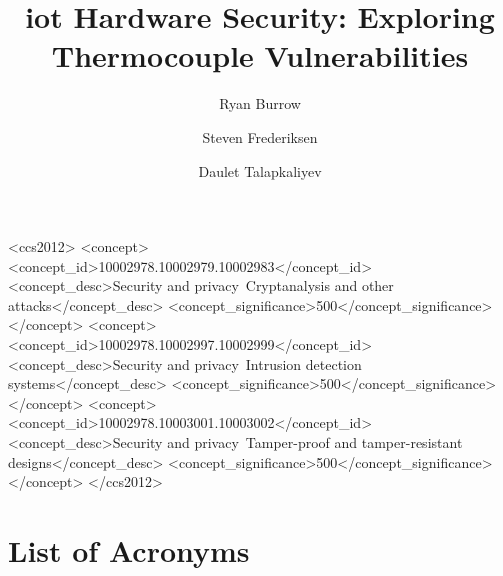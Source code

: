 \documentclass[sigconf,numbers,sort&compress,colorlinks]{acmart}
\begin{document}
\title{\ac{iot} Hardware Security: Exploring Thermocouple Vulnerabilities}

\author{Ryan Burrow}

\author{Steven Frederiksen}

\author{Daulet Talapkaliyev}




%
%
\begin{CCSXML}
<ccs2012>
<concept>
<concept_id>10002978.10002979.10002983</concept_id>
<concept_desc>Security and privacy~Cryptanalysis and other attacks</concept_desc>
<concept_significance>500</concept_significance>
</concept>
<concept>
<concept_id>10002978.10002997.10002999</concept_id>
<concept_desc>Security and privacy~Intrusion detection systems</concept_desc>
<concept_significance>500</concept_significance>
</concept>
<concept>
<concept_id>10002978.10003001.10003002</concept_id>
<concept_desc>Security and privacy~Tamper-proof and tamper-resistant designs</concept_desc>
<concept_significance>500</concept_significance>
</concept>
</ccs2012>
\end{CCSXML}



\maketitle










\appendix


\section{List of Acronyms}
\printacronyms[include-classes=acron, name=]
\end{document}
